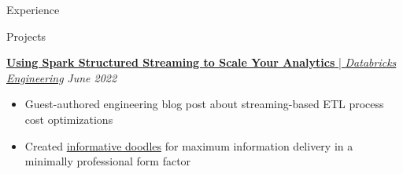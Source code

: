 \documentclass{content/resume/resume}
\begin{document}
\begin{rSection}{Experience}
  
\end{rSection}

\begin{rSection}{Projects}
  
  
  \href{https://databricks.com/blog/2022/07/14/using-spark-structured-streaming-to-scale-your-analytics.html}{{\bf Using Spark Structured Streaming to Scale Your Analytics} | {\em Databricks Engineering}} \hfill {\em June 2022}
  \vspace{-6pt}
  \begin{itemize}[nosep]
    \item Guest-authored engineering blog post about streaming-based ETL process cost optimizations
    \item Created \href{https://www.databricks.com/blog/2022/07/14/using-spark-structured-streaming-to-scale-your-analytics.html#:~:text=With\%20your\%20new\%20aggregated\%20data\%2C\%20you\%20can\%20throw\%20together\%20a\%20nice\%20visualization\%20to\%20do...\%20business\%20things.}{informative doodles} for maximum information delivery in a minimally professional form factor
  \end{itemize}


\end{rSection}
\end{document}
